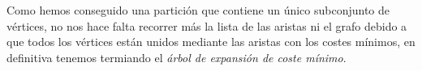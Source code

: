 Como hemos conseguido una partición que contiene un único subconjunto de vértices, no nos hace falta recorrer más la lista de las aristas ni el grafo debido a que todos los vértices están unidos mediante las aristas con los costes mínimos, en definitiva tenemos termiando el \textit{árbol de expansión de coste mínimo}.


